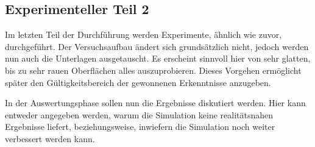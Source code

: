 \subsection{Experimenteller Teil 2}
Im letzten Teil der Durchführung werden Experimente, ähnlich wie zuvor,
durchgeführt. Der Versuchsaufbau ändert sich grundsätzlich nicht, jedoch werden
nun auch die Unterlagen ausgetauscht. Es erscheint sinnvoll hier von sehr
glatten, bis zu sehr rauen Oberflächen alles auszuprobieren. Dieses Vorgehen
ermöglicht später den Gültigkeitsbereich der gewonnenen Erkenntnisse anzugeben.

In der Auswertungsphase sollen nun die Ergebnisse diskutiert werden. Hier kann
entweder angegeben werden, warum die Simulation keine realitätsnahen Ergebnisse
liefert, beziehungsweise, inwiefern die Simulation noch weiter verbessert
werden kann.
